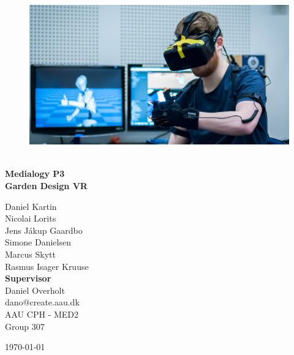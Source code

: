 \begin{titlepage}
			
\addtolength{\voffset}{2cm}

\begin{figure}[H]
\centering
\vspace{2cm}	%
\includegraphics[width=0.99\linewidth]{figure/Frontpage/frontpage_bg.jpg}
\end{figure}

\mbox{}
\vfill
\renewcommand{\familydefault}{\sfdefault} \normalfont %
\HRule\\[0.2cm]
\textbf{{\small Medialogy P3\\ \Huge Garden Design VR}}\\
\HRule\medskip{}
\begin{multicols}{2}
{\Large Daniel Kartin\vspace{0.3mm}\\Nicolai Lorits\\Jens Jákup Gaardbo\\Simone Danielsen\\Marcus Skytt\\Rasmus Isager Kruuse\columnbreak}\\
\setlength{\parskip}{2.4cm}
\Large{\textbf{Supervisor}\\Daniel Overholt\\dano@create.aau.dk}
\\\small AAU CPH - 
MED2 \\
Group 307\\
\end{multicols}
\today
\renewcommand{\familydefault}{\rmdefault} \normalfont %
\end{titlepage}


